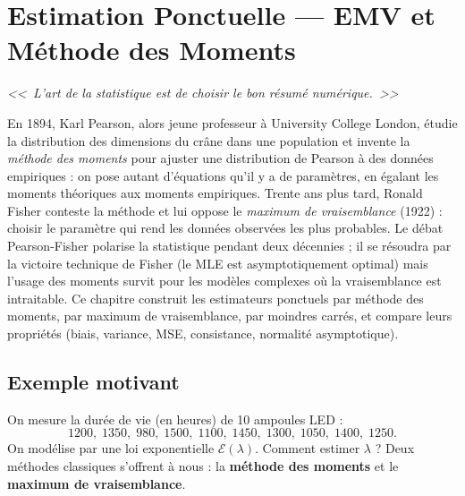 \chapter{Estimation Ponctuelle --- EMV et M\'ethode des Moments}
\label{ch:estimation}

\begin{center}
\textit{<<~L'art de la statistique est de choisir le bon r\'esum\'e num\'erique.~>>}
\end{center}

En 1894, Karl Pearson, alors jeune professeur à University College London, étudie la distribution des dimensions du crâne dans une population et invente la \emph{méthode des moments} pour ajuster une distribution de Pearson à des données empiriques : on pose autant d'équations qu'il y a de paramètres, en égalant les moments théoriques aux moments empiriques. Trente ans plus tard, Ronald Fisher conteste la méthode et lui oppose le \emph{maximum de vraisemblance} (1922) : choisir le paramètre qui rend les données observées les plus probables. Le débat Pearson-Fisher polarise la statistique pendant deux décennies ; il se résoudra par la victoire technique de Fisher (le MLE est asymptotiquement optimal) mais l'usage des moments survit pour les modèles complexes où la vraisemblance est intraitable. Ce chapitre construit les estimateurs ponctuels par méthode des moments, par maximum de vraisemblance, par moindres carrés, et compare leurs propriétés (biais, variance, MSE, consistance, normalité asymptotique).

\section{Exemple motivant}

On mesure la dur\'ee de vie (en heures) de 10 ampoules LED :
\[
1200,\; 1350,\; 980,\; 1500,\; 1100,\; 1450,\; 1300,\; 1050,\; 1400,\; 1250.
\]
On mod\'elise par une loi exponentielle $\mathcal{E}(\lambda)$. Comment estimer $\lambda$ ? Deux m\'ethodes classiques s'offrent \`a nous : la \textbf{m\'ethode des moments} et le \textbf{maximum de vraisemblance}.

